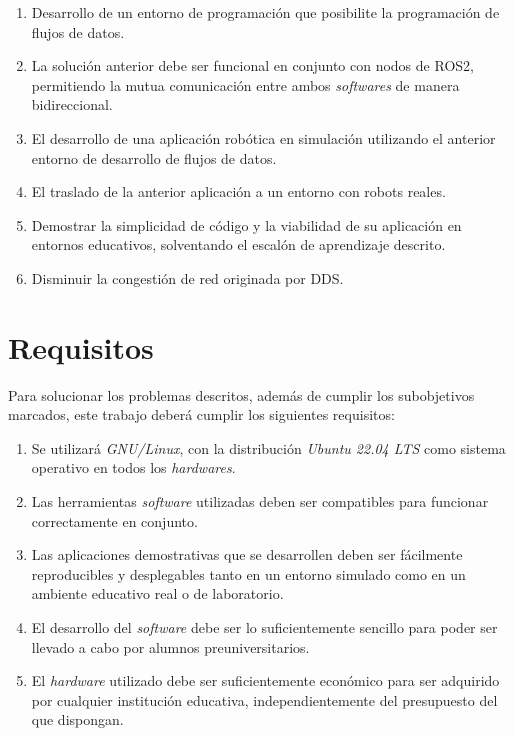 \begin{enumerate}
    \item{Desarrollo de un entorno de programación que posibilite la
        programación de flujos de datos.}
    \item{La solución anterior debe ser funcional en conjunto con nodos de ROS2,
        permitiendo la mutua comunicación entre ambos \textit{softwares} de
        manera bidireccional.}
    \item{El desarrollo de una aplicación robótica en simulación utilizando el
        anterior entorno de desarrollo de flujos de datos.}
    \item{El traslado de la anterior aplicación a un entorno con robots reales.}
    \item{Demostrar la simplicidad de código y la viabilidad de su aplicación en
        entornos educativos, solventando el escalón de aprendizaje descrito.}
    \item{Disminuir la congestión de red originada por DDS.}
\end{enumerate}


\section{Requisitos}
\label{sec:requisitos}

Para solucionar los problemas descritos, además de cumplir los subobjetivos
marcados, este trabajo deberá cumplir los siguientes requisitos:

\begin{enumerate}
    \item{Se utilizará \textit{GNU/Linux}, con la distribución
        \textit{Ubuntu 22.04 LTS} como sistema operativo en todos los
        \textit{hardwares}.}
    \item{Las herramientas \textit{software} utilizadas deben ser compatibles
        para funcionar correctamente en conjunto.}
    \item{Las aplicaciones demostrativas que se desarrollen deben ser fácilmente
        reproducibles y desplegables tanto en un entorno simulado como en un
        ambiente educativo real o de laboratorio.}
    \item{El desarrollo del \textit{software} debe ser lo suficientemente
        sencillo para poder ser llevado a cabo por alumnos preuniversitarios.}
    \item{El \textit{hardware} utilizado debe ser suficientemente económico para
        ser adquirido por cualquier institución educativa, independientemente
        del presupuesto del que dispongan.}
\end{enumerate}



